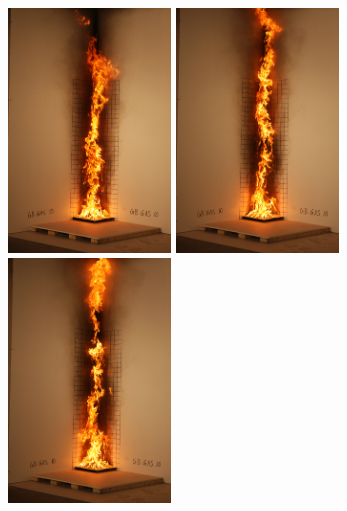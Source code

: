 \documentclass[twoside]{uocthesis}
\begin{document}
\begin{figure}[p]
	\includegraphics[width=1.7in]{../Figures/GBGAS10_IMG_2046}
	\includegraphics[width=1.7in]{../Figures/GBGAS10_IMG_2047}
	\includegraphics[width=1.7in]{../Figures/GBGAS10_IMG_2048} \\


\end{figure}
\end{document}
